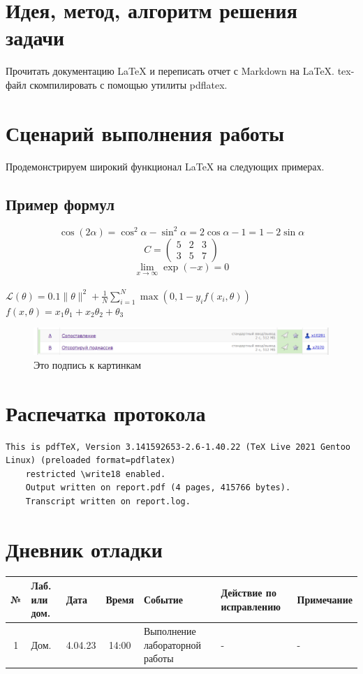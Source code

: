 \documentclass[12pt, letterpaper]{article}
\begin{document}
\section{Идея, метод, алгоритм решения задачи}
Прочитать документацию \LaTeX{} и переписать отчет с Markdown на \LaTeX{}. tex-файл скомпилировать с помощью утилиты pdflatex.
\section{Сценарий выполнения работы}
Продемонстрируем широкий функционал \LaTeX{} на следующих примерах.
\subsection{Пример формул}
\[\cos (2\alpha) = \cos^2 \alpha - \sin^2 \alpha = 2\cos\alpha - 1 = 1 - 2\sin\alpha\]
\[C=
\begin{pmatrix}
5 & 2 & 3\\
3 & 5 & 7
\end{pmatrix}\]
\[
\lim\limits_{x \to \infty} \exp(-x) = 0
\] \\
$\mathcal{L}(\theta) = 0.1 \|\theta\|^2 + \frac{1}{N}\sum\limits_{i=1}^N \max(0, 1 - y_i f(x_i, \theta))$ \\
$f(x, \theta) = x_1 \theta_1 + x_2 \theta_2 + \theta_3$ \\
\begin{figure}[h]
\centering
\includegraphics[width=0.9\linewidth]{pic1.png}
\caption{Это подпись к картинкам}
\label{fig:mpr}
\end{figure}
\section{Распечатка протокола}
\begin{lstlisting}[breaklines]
    This is pdfTeX, Version 3.141592653-2.6-1.40.22 (TeX Live 2021 Gentoo Linux) (preloaded format=pdflatex)
    restricted \write18 enabled.
    Output written on report.pdf (4 pages, 415766 bytes).
    Transcript written on report.log.
\end{lstlisting}  
\section{Дневник отладки}
\begin{tabular}{|c|p{1cm}|p{1.5cm}|c|p{2.5cm}|p{2cm}|p{2.25cm}|}
    \hline
    № & Лаб. или дом. & Дата & Время & Событие & Действие по исправлению & Примечание\\
    \hline
    1 & Дом. & 4.04.23 & 14:00 & Выполнение лабораторной работы & - & -\\
    \hline
\end{tabular}
\end{document}
